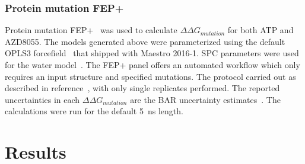 \documentclass[phd,tocprelim]{cornell}
\begin{document}
\subsubsection{Protein mutation FEP+}
Protein mutation FEP+~\citep{Wang2015-cn,Hauser:2018vz,Abel:2017jt} was used to calculate $\Delta \Delta G_{mutation}$ for both ATP and AZD8055. The models generated above were parameterized using the default OPLS3 forcefield~\citep{Harder2016-zn} that shipped with Maestro 2016-1. SPC parameters were used for the water model~\citep{Berendsen:1981cq}. The FEP+ panel offers an automated workflow which only requires an input structure and specified mutations. The protocol carried out as described in reference~\cite{Hauser:2018vz}, with only single replicates performed. The reported uncertainties in each $\Delta \Delta G_{mutation}$ are the BAR uncertainty estimates~\citep{Bennett:1976gj,Shirts:2003cf}. The calculations were run for the default 5~ns length.


\section{Results}
\end{document}
